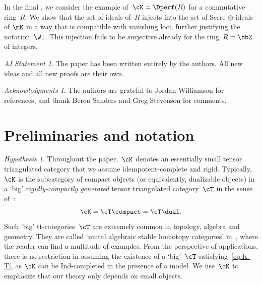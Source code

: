 \documentclass[11pt]{amsart}
\numberwithin{equation}{section} %
\theoremstyle{plain}
\theoremstyle{definition}
\theoremstyle{remark}
\newtheorem{hyp}[equation]{Hypothesis}
\newtheorem*{AIstatement}{AI Statement}
\newtheorem*{ack}{Acknowledgments}
\begin{document}
In the final , we consider the example of~$\cK=\Dperf(R)$ for a commutative ring~$R$. We show that the set of ideals of~$R$ injects into the set of Serre $\otimes$-ideals of $\mK$ in a way that is compatible with vanishing loci, further justifying the notation~$\WI$. This injection fails to be surjective already for the ring~$R=\bbZ$ of integers.

\begin{AIstatement}
The paper has been written entirely by the authors.
All new ideas and all new proofs are their own.
\end{AIstatement}

\begin{ack}
The authors are grateful to Jordan Williamson for references, and thank Beren Sanders and Greg Stevenson for comments.
\end{ack}


\tableofcontents

\section{Preliminaries and notation}
%

%
\begin{hyp}
\label{hyp:K-T}%
Throughout the paper,~$\cK$ denotes an essentially small tensor triangulated category that we assume idempotent-complete and rigid. Typically, $\cK$ is the subcategory of compact objects (or equivalently, dualizable objects) in a `big' \emph{rigidly-compactly generated} tensor triangulated category~$\cT$ in the sense of~\cite{BalmerFavi11}:
%
\begin{equation}
\label{eq:K-T}%
\cK=\cT\compact=\cT\dual.
\end{equation}
%
Such `big' tt-categories~$\cT$ are extremely common in topology, algebra and geometry. They are called `unital algebraic stable homotopy categories' in~\cite{HoveyPalmieriStrickland97}, where the reader can find a multitude of examples.
From the perspective of applications, there is no restriction in assuming the existence of a `big'~$\cT$ satisfying~\eqref{eq:K-T}, as $\cK$ can be Ind-completed in the presence of a model. We use~$\cK$ to emphasize that our theory only depends on small objects.
\end{hyp}
\end{document}
